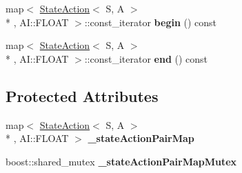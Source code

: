 \begin{DoxyCompactItemize}
\item 
\hypertarget{classAI_1_1StateActionPairContainer_abb152cc2644ba6fad1da5476b746dd30}{map$<$ \hyperlink{classAI_1_1StateAction}{State\-Action}$<$ S, A $>$\\*
, A\-I\-::\-F\-L\-O\-A\-T $>$\-::const\-\_\-iterator {\bfseries begin} () const }\label{classAI_1_1StateActionPairContainer_abb152cc2644ba6fad1da5476b746dd30}

\item 
\hypertarget{classAI_1_1StateActionPairContainer_a36cb0d1278cd67b4a7b4967ef6740937}{map$<$ \hyperlink{classAI_1_1StateAction}{State\-Action}$<$ S, A $>$\\*
, A\-I\-::\-F\-L\-O\-A\-T $>$\-::const\-\_\-iterator {\bfseries end} () const }\label{classAI_1_1StateActionPairContainer_a36cb0d1278cd67b4a7b4967ef6740937}

\end{DoxyCompactItemize}
\subsection*{Protected Attributes}
\begin{DoxyCompactItemize}
\item 
\hypertarget{classAI_1_1StateActionPairContainer_afeb95c4cb5d37ce8f8fd1a2b3518211b}{map$<$ \hyperlink{classAI_1_1StateAction}{State\-Action}$<$ S, A $>$\\*
, A\-I\-::\-F\-L\-O\-A\-T $>$ {\bfseries \-\_\-state\-Action\-Pair\-Map}}\label{classAI_1_1StateActionPairContainer_afeb95c4cb5d37ce8f8fd1a2b3518211b}

\item 
\hypertarget{classAI_1_1StateActionPairContainer_a70b98a34845bd7744fa4e8b7c3163939}{boost\-::shared\-\_\-mutex {\bfseries \-\_\-state\-Action\-Pair\-Map\-Mutex}}\label{classAI_1_1StateActionPairContainer_a70b98a34845bd7744fa4e8b7c3163939}

\end{DoxyCompactItemize}



